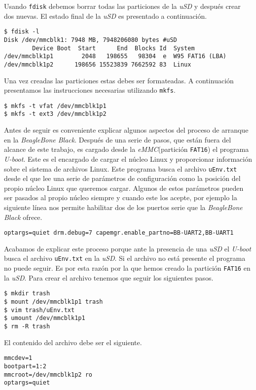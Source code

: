 		Usando \texttt{fdisk} debemos borrar todas las particiones de la \emph{uSD} y después crear dos nuevas. El estado final de la
		\emph{uSD} es presentado a continuación.
		\begin{lstlisting}[style=myBash]
$ fdisk -l
Disk /dev/mmcblk1: 7948 MB, 7948206080 bytes #uSD
        Device Boot  Start      End  Blocks Id  System
/dev/mmcblk1p1        2048   198655   98304  e  W95 FAT16 (LBA)
/dev/mmcblk1p2      198656 15523839 7662592 83  Linux
		\end{lstlisting}
		Una vez creadas las particiones estas debes ser formateadas. A continuación presentamos las instrucciones necesarias utilizando
		\texttt{mkfs}.
		\begin{lstlisting}[style=myBash]
$ mkfs -t vfat /dev/mmcblk1p1
$ mkfs -t ext3 /dev/mmcblk1p2
		\end{lstlisting}
		Antes de seguir es conveniente explicar algunos aspectos del proceso de arranque en la \emph{BeagleBone Black}. Después de una serie
		de pasos, que están fuera del alcance de este trabajo, es cargado desde la \emph{eMMC}(partición \texttt{FAT16}) el programa
		\emph{U-boot}. Este es el encargado de cargar el núcleo Linux y proporcionar información sobre el sistema de archivos Linux. Este
		programa busca el archivo \texttt{uEnv.txt} desde el que lee una serie de parámetros de configuración como la posición del propio
		núcleo Linux que queremos cargar. Algunos de estos parámetros pueden ser pasados al propio núcleo siempre y cuando este los acepte,
		por ejemplo la siguiente línea nos permite habilitar dos de los puertos serie que la \emph{BeagleBone Black} ofrece.
		\begin{lstlisting}[style=myFile]
optargs=quiet drm.debug=7 capemgr.enable_partno=BB-UART2,BB-UART1
		\end{lstlisting}
		Acabamos de explicar este proceso porque ante la presencia de una \emph{uSD} el \emph{U-boot} busca el archivo \texttt{uEnv.txt} en la
		\emph{uSD}. Si el archivo no está presente el programa no puede seguir. Es por esta razón por la que hemos creado la partición
		\texttt{FAT16} en la \emph{uSD}. Para crear el archivo tenemos que seguir los siguientes pasos.
		\begin{lstlisting}[style=myBash]
$ mkdir trash
$ mount /dev/mmcblk1p1 trash
$ vim trash/uEnv.txt
$ umount /dev/mmcblk1p1
$ rm -R trash
		\end{lstlisting}
		El contenido del archivo debe ser el siguiente.
		\begin{lstlisting}[style=myFile]
mmcdev=1
bootpart=1:2
mmcroot=/dev/mmcblk1p2 ro
optargs=quiet 
		\end{lstlisting}
